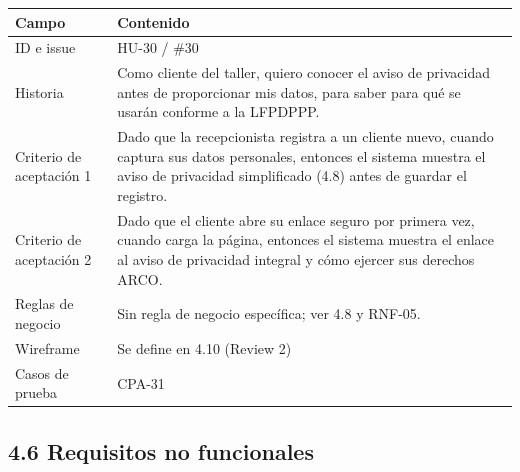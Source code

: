 {\def\LTcaptype{none} %
\begin{longtable}[]{@{}
  >{\raggedright\arraybackslash}p{}
  >{\raggedright\arraybackslash}p{}@{}}
\toprule\noalign{}
\begin{minipage}[b]{\linewidth}\raggedright
\textbf{Campo}
\end{minipage} & \begin{minipage}[b]{\linewidth}\raggedright
\textbf{Contenido}
\end{minipage} \\
\midrule\noalign{}
\endhead
\bottomrule\noalign{}
\endlastfoot
ID e issue & HU-30 / \#30 \\
Historia & Como cliente del taller, quiero conocer el aviso de
privacidad antes de proporcionar mis datos, para saber para qué se
usarán conforme a la LFPDPPP. \\
Criterio de aceptación 1 & Dado que la recepcionista registra a un
cliente nuevo, cuando captura sus datos personales, entonces el sistema
muestra el aviso de privacidad simplificado (4.8) antes de guardar el
registro. \\
Criterio de aceptación 2 & Dado que el cliente abre su enlace seguro por
primera vez, cuando carga la página, entonces el sistema muestra el
enlace al aviso de privacidad integral y cómo ejercer sus derechos
ARCO. \\
Reglas de negocio & Sin regla de negocio específica; ver 4.8 y
RNF-05. \\
Wireframe & Se define en 4.10 (Review 2) \\
Casos de prueba & CPA-31 \\
\end{longtable}
}


\subsection{4.6 Requisitos no
funcionales}\label{requisitos-no-funcionales}

